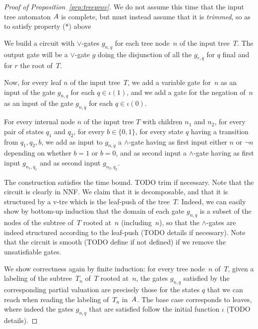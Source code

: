 \begin{proof}[Proof of Proposition~\ref{prp:treeprov}]
  We do not assume this time that the input tree automaton $A$ is complete, but
  must instead assume that it is \emph{trimmed}, so as to satisfy property (*)
  above 

  We build a circuit with $\lor$-gates $g_{n,q}$ for each tree node~$n$ of the
  input tree~$T$.
  The output gate will be a $\lor$-gate $g$ doing the disjunction of all the
  $g_{r,q}$ for $q$ final and for $r$ the root of~$T$.

  Now, for every leaf $n$ of the input tree~$T$, we add
  a variable gate for~$n$ as an input of the gate $g_{n,q}$ for each $q \in \iota(1)$, and
  we add a gate for the negation of~$n$ as an input of the gate $g_{n,q}$ for
  each $q \in \iota(0)$.

  For every internal node $n$ of the input tree $T$ with children $n_1$ and
  $n_2$, for every pair of states $q_1$ and $q_2$, for every $b \in \{0, 1\}$,
  for every state $q$ having a transition from $q_1, q_2, b$, we add as input to
  $g_{n,q}$ a $\land$-gate having as first input either $n$ or $\neg n$
  depending on whether $b=1$ or $b=0$, and as second input a $\land$-gate having
  as first input $g_{n_1,q_1}$ and as second input $g_{n_2,q_2}$.

  The construction satisfies the time bound. TODO trim if necessary. Note that
  the circuit is clearly in NNF. We claim that it is decomposable, and that it
  is structured by a v-tre which is the leaf-push of the tree~$T$. Indeed, we
  can easily show by bottom-up induction that the domain of each gate $g_{n,q}$
  is a subset of the nodes of the subtree of~$T$ rooted at~$n$ (including~$n$),
  so that the $\land$-gates are indeed structured according to the leaf-push
  (TODO details if necessary).
  Note that the circuit is smooth (TODO define if not defined) if we remove the
  unsatisfiable gates.

  We show correctness again by finite induction: for every tree node~$n$ of~$T$, given
  a labeling of the subtree~$T_n$ of~$T$ rooted at~$n$,
  the gates $g_{n,q}$ satisfied by the corresponding partial valuation are
  precisely those for the states $q$ that we can reach
  when reading the labeling of~$T_n$ in~$A$.
  The base case corresponds to leaves, where indeed the gates $g_{n,q}$ that are
  satisfied follow the initial function $\iota$ (TODO details).


\end{proof}
